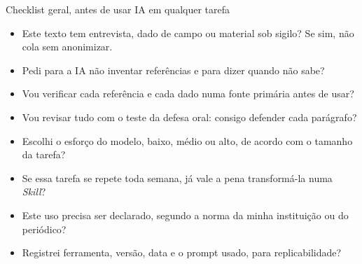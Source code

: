 \documentclass[11pt,aspectratio=169,t]{beamer}
\begin{document}
\begin{frame}{Checklist geral, antes de usar IA em qualquer tarefa}
  \small
  \begin{itemize}
    \item[$\square$] Este texto tem entrevista, dado de campo ou material sob sigilo? Se sim, não cola sem anonimizar.
    \item[$\square$] Pedi para a IA não inventar referências e para dizer quando não sabe?
    \item[$\square$] Vou verificar cada referência e cada dado numa fonte primária antes de usar?
    \item[$\square$] Vou revisar tudo com o teste da defesa oral: consigo defender cada parágrafo?
    \item[$\square$] Escolhi o esforço do modelo, baixo, médio ou alto, de acordo com o tamanho da tarefa?
    \item[$\square$] Se essa tarefa se repete toda semana, já vale a pena transformá-la numa \textit{Skill}?
    \item[$\square$] Este uso precisa ser declarado, segundo a norma da minha instituição ou do periódico?
    \item[$\square$] Registrei ferramenta, versão, data e o prompt usado, para replicabilidade?
  \end{itemize}
\end{frame}
\end{document}
